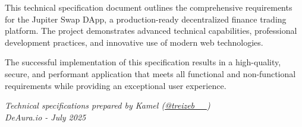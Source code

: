\documentclass[12pt,a4paper]{article}
\begin{document}
This technical specification document outlines the comprehensive requirements for the Jupiter Swap DApp, a production-ready decentralized finance trading platform. The project demonstrates advanced technical capabilities, professional development practices, and innovative use of modern web technologies.

The successful implementation of this specification results in a high-quality, secure, and performant application that meets all functional and non-functional requirements while providing an exceptional user experience.

\vspace{1cm}

\begin{center}
\textit{Technical specifications prepared by Kamel (\href{https://x.com/treizeb__}{@treizeb\_\_})\\
DeAura.io - July 2025}
\end{center}
\end{document}
